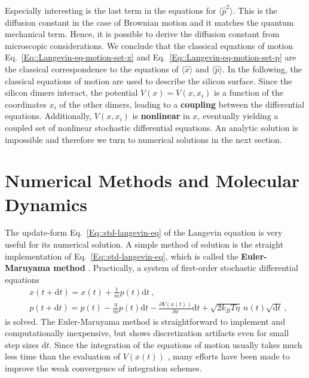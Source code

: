	Especially interesting is the last term in the equations for $\langle \hat{p}^2 \rangle$. This is the diffusion constant in the case of Brownian motion and it matches the quantum mechanical term. Hence, it is possible to derive the diffusion constant from microscopic considerations. We conclude that the classical equations of motion Eq.~\eqref{Eq::Langevin-eq-motion-set-x} and Eq.~\eqref{Eq::Langevin-eq-motion-set-p} are the classical correspondence to the equations of $\langle \hat{x} \rangle$ and $\langle \hat{p} \rangle$. In the following, the classical equations of motion are used to describe the silicon surface. Since the silicon dimers interact, the potential $V(x) =	V(x, {x_i})$ is a function of the coordinates $x_i$ of the other dimers, leading to a \textbf{coupling} between the differential equations. Additionally, $V(x, {x_i})$ is \textbf{nonlinear} in $x$, eventually yielding a coupled set of nonlinear stochastic differential equations. An analytic solution is impossible and therefore we turn to numerical solutions in the next section.
	\section{Numerical Methods and Molecular Dynamics} \label{Section::Numerical-methods}
	The update-form Eq.~\eqref{Eq::std-langevin-eq} of the Langevin equation is very useful for its numerical solution. A simple method of solution is the straight implementation of Eq.~\eqref{Eq::std-langevin-eq}, which is called the \textbf{Euler-Maruyama method} \cite{kloeden1992stochastic}. Practically, a system of first-order stochastic differential equations
	\begin{align}
		&x(t + \text{d}t) = x(t)	+ \frac{1}{m} p(t) \text{d}t ~, \\
		&p(t + \text{d}t) =	p(t) - \frac{\eta}{m} p(t) \text{d}t - \frac{\partial V(x(t))}{\partial x} \text{d}t + \sqrt{2 k_B T \eta} ~ n(t) \sqrt{\text{d}t} ~,
	\end{align}
	is solved. The Euler-Maruyama method is straightforward to implement and computationally inexpensive, but shows discretization artifacts even for small step sizes $\text{d}t$. Since the integration of the equations of motion usually takes much less time than the evaluation of $V(x(t))$ \cite{frenkel2023understanding}, many efforts have been made to improve the weak convergence \cite{kloeden1992stochastic} of integration schemes. \\
	
